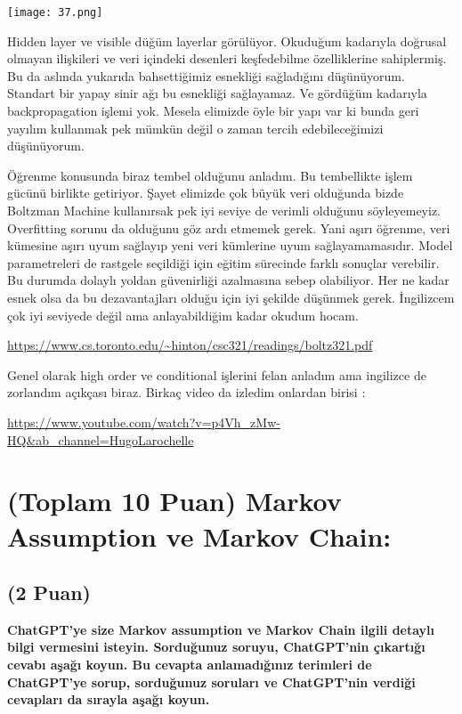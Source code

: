 \documentclass[11pt]{article}
\begin{document}
\begin{center}
    \texttt{[image: 37.png]}
\end{center}

Hidden layer ve visible düğüm layerlar görülüyor. Okuduğum kadarıyla doğrusal olmayan ilişkileri ve veri içindeki desenleri keşfedebilme özelliklerine sahiplermiş. Bu da aslında yukarıda bahsettiğimiz esnekliği sağladığını düşünüyorum. Standart bir yapay sinir ağı bu esnekliği sağlayamaz. Ve gördüğüm kadarıyla backpropagation işlemi yok. Mesela elimizde öyle bir yapı var ki bunda geri yayılım kullanmak pek mümkün değil o zaman tercih edebileceğimizi düşünüyorum.

Öğrenme konusunda biraz tembel olduğunu anladım. Bu tembellikte işlem gücünü birlikte getiriyor.
Şayet elimizde çok büyük veri olduğunda bizde Boltzman Machine kullanırsak pek iyi seviye de verimli olduğunu söyleyemeyiz.
Overfitting sorunu da olduğunu göz ardı etmemek gerek. Yani aşırı öğrenme, veri kümesine aşırı uyum sağlayıp yeni veri kümlerine uyum sağlayamamasıdır.
Model parametreleri de rastgele seçildiği için eğitim sürecinde farklı sonuçlar verebilir. Bu durumda dolaylı yoldan güvenirliği azalmasına sebep olabiliyor. Her ne kadar esnek olsa da bu dezavantajları olduğu için iyi şekilde düşünmek gerek.
İngilizcem çok iyi seviyede değil ama anlayabildiğim kadar okudum hocam. 

\url{https://www.cs.toronto.edu/~hinton/csc321/readings/boltz321.pdf}

Genel olarak high order ve conditional işlerini felan anladım ama ingilizce de zorlandım açıkçası biraz.
Birkaç video da izledim onlardan birisi :

\url{https://www.youtube.com/watch?v=p4Vh_zMw-HQ&ab_channel=HugoLarochelle}


\section{(Toplam 10 Puan) Markov Assumption ve Markov Chain:}

\subsection{(2 Puan)} \textbf{ChatGPT’ye size Markov assumption ve Markov Chain ilgili detaylı bilgi vermesini isteyin. Sorduğunuz soruyu, ChatGPT'nin çıkartığı cevabı aşağı koyun. Bu cevapta anlamadığınız terimleri de ChatGPT’ye sorup, sorduğunuz soruları ve ChatGPT’nin verdiği cevapları da sırayla aşağı koyun.}
\end{document}
